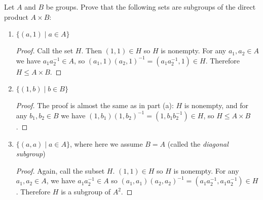  Let $A$ and $B$ be groups. Prove that the following sets
are subgroups of the direct product $A\times B$:
\begin{enumerate}
\item $\{(a, 1) \mid a\in A\}$
  \begin{proof}
    Call the set $H$. Then $(1,1)\in H$ so $H$ is nonempty. For any
    $a_1,a_2\in A$ we have $a_1a_2^{-1}\in A$, so
    $(a_1,1)(a_2,1)^{-1} = (a_1a_2^{-1}, 1)\in H$. Therefore
    $H\leq A\times B$.
  \end{proof}
\item $\{(1, b) \mid b\in B\}$
  \begin{proof}
    The proof is almost the same as in part (a): $H$ is nonempty, and
    for any $b_1,b_2\in B$ we have
    $(1,b_1)(1,b_2)^{-1} = (1,b_1b_2^{-1})\in H$, so
    $H\leq A\times B$.
  \end{proof}
\item $\{(a, a) \mid a\in A\}$, where here we assume $B = A$ (called
  the {\em diagonal subgroup})
  \begin{proof}
    Again, call the subset $H$. $(1,1)\in H$ so $H$ is nonempty. For
    any $a_1,a_2\in A$, we have $a_1a_2^{-1}\in A$ so
    $(a_1,a_1)(a_2,a_2)^{-1} = (a_1a_2^{-1}, a_1a_2^{-1})\in
    H$. Therefore $H$ is a subgroup of $A^2$.
  \end{proof}
\end{enumerate}
